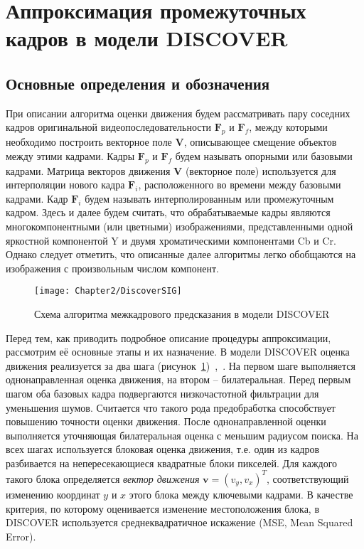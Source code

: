 \section{Аппроксимация промежуточных кадров в модели DISCOVER}
\label{chap:SIG:ReferenceAlgo}

\subsection{Основные определения и обозначения}
\label{chap:SIG:ReferenceAlgo:Notation}

При описании алгоритма оценки движения будем рассматривать пару соседних кадров оригинальной видеопоследовательности $\mathbf{F}_p$ и $\mathbf{F}_f$, между которыми необходимо построить векторное поле $\mathbf{V}$, описывающее смещение объектов между этими кадрами. Кадры $\mathbf{F}_p$ и $\mathbf{F}_f$ будем называть опорными или базовыми кадрами. Матрица векторов движения $\mathbf{V}$ (векторное поле) используется для интерполяции нового кадра $\mathbf{F}_i$, расположенного во времени между базовыми кадрами. Кадр $\mathbf{F}_i$ будем называть интерполированным или промежуточным кадром. Здесь и далее будем считать, что обрабатываемые кадры являются многокомпонентными (или цветными) изображениями, представленными одной яркостной компонентой Y и двумя хроматическими компонентами Cb и Cr. Однако следует отметить, что описанные далее алгоритмы легко обобщаются на изображения с произвольным числом компонент.

\begin{figure}[th]
\begin{center}
\texttt{[image: Chapter2/DiscoverSIG]}
\end{center}
\caption{Схема алгоритма межкадрового предсказания в модели DISCOVER}
\label{fig:ch2:DiscoverSIG}
\end{figure}

Перед тем, как приводить подробное описание процедуры аппроксимации, рассмотрим её основные этапы и их назначение. В модели DISCOVER оценка движения реализуется за два шага (рисунок~\ref{fig:ch2:DiscoverSIG})~\cite{Ascenso2006},~\cite{Ascenso2005}. На первом шаге выполняется однонаправленная оценка движения, на втором – билатеральная. Перед первым шагом оба базовых кадра подвергаются низкочастотной фильтрации для уменьшения шумов. Считается что такого рода предобработка способствует повышению точности оценки движения. После однонаправленной оценки выполняется уточняющая билатеральная оценка с меньшим радиусом поиска.
На всех шагах используется блоковая оценка движения, т.е. один из кадров разбивается на непересекающиеся квадратные блоки пикселей. Для каждого такого блока определяется \emph{вектор движения} $\mathbf{v}=(v_y,v_x)^T$, соответствующий изменению координат $y$ и $x$ этого блока между ключевыми кадрами. В качестве критерия, по которому оценивается изменение местоположения блока, в DISCOVER используется среднеквадратичное искажение (MSE, Mean Squared Error).

